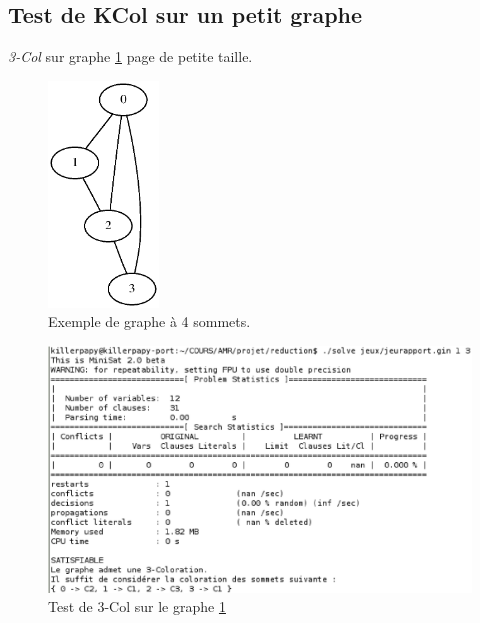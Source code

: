   \subsection{Test de KCol sur un petit graphe\label{an2}}
  \emph{3-Col} sur graphe \ref{graphe} page \pageref{graphe} de petite
  taille.
  \begin{figure}[!ht]
   \begin{center}
    \includegraphics[height=6cm]{images/jeurap.ps}
    \caption{Exemple de graphe à 4 sommets.\label{graphe}}
   \end{center}
  \end{figure}
  
  \begin{figure}[!ht]
   \begin{center}
    \includegraphics[width=12cm]{images/3-Col.eps}
    \caption{Test de 3-Col sur le graphe \ref{graphe}}
   \end{center}
  \end{figure}
  
